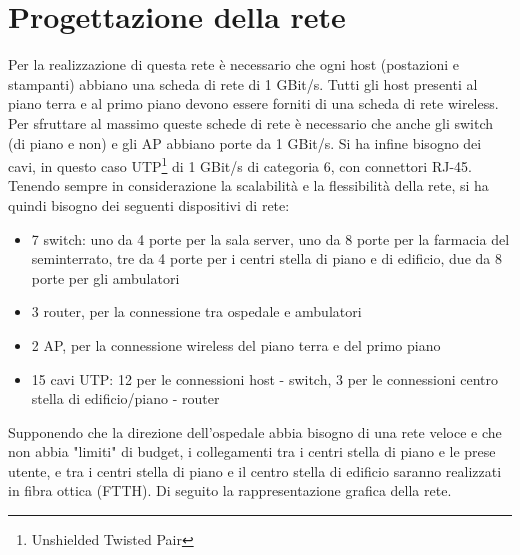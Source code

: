 \section{Progettazione della rete}
\hspace{24pt}Per la realizzazione di questa rete è necessario che ogni host (postazioni e stampanti) abbiano una scheda 
di rete di 1 GBit/s. Tutti gli host presenti al piano terra e al primo piano devono essere forniti di una scheda 
di rete wireless. Per sfruttare al massimo queste schede di rete è necessario che anche gli switch (di piano e non) 
e gli AP abbiano porte da 1 GBit/s. Si ha infine bisogno dei cavi, in questo caso UTP\footnote{Unshielded Twisted Pair} 
di 1 GBit/s di categoria 6, con connettori RJ-45. Tenendo sempre in considerazione la scalabilità e la flessibilità 
della rete, si ha quindi bisogno dei seguenti dispositivi di rete:\\
\begin{itemize}
	\item 7 switch: uno da 4 porte per la sala server, uno da 8 porte per la farmacia del seminterrato, 
	tre da 4 porte per i centri stella di piano e di edificio, due da 8 porte per gli ambulatori
	\item 3 router, per la connessione tra ospedale e ambulatori
	\item 2 AP, per la connessione wireless del piano terra e del primo piano
	\item 15 cavi UTP: 12 per le connessioni host - switch, 3 per le connessioni centro stella 
		  di edificio/piano - router 
\end{itemize}
Supponendo che la direzione dell'ospedale abbia bisogno di una rete veloce e che non abbia "limiti" di budget, i 
collegamenti tra i centri stella di piano e le prese utente, e tra i centri stella di piano e il centro stella di 
edificio saranno realizzati in fibra ottica (FTTH).
Di seguito la rappresentazione grafica della rete.
\vspace*{24pt}
\begin{center}
\end{center}